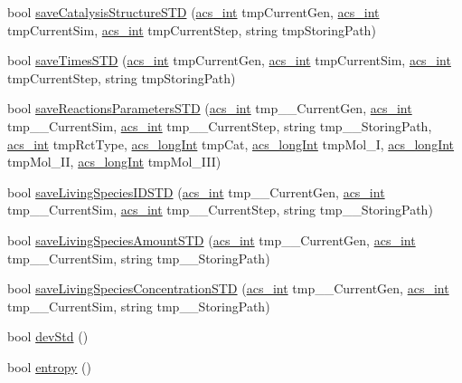 \begin{DoxyCompactItemize}
\item 
bool \hyperlink{a00014_a0a799b3a42bd90845a915298e184708c}{save\-Catalysis\-Structure\-S\-T\-D} (\hyperlink{a00072_a8d277355641a098190360234e2ebde35}{acs\-\_\-int} tmp\-Current\-Gen, \hyperlink{a00072_a8d277355641a098190360234e2ebde35}{acs\-\_\-int} tmp\-Current\-Sim, \hyperlink{a00072_a8d277355641a098190360234e2ebde35}{acs\-\_\-int} tmp\-Current\-Step, string tmp\-Storing\-Path)
\item 
bool \hyperlink{a00014_a73e83c4fcfe612514714a6692270351e}{save\-Times\-S\-T\-D} (\hyperlink{a00072_a8d277355641a098190360234e2ebde35}{acs\-\_\-int} tmp\-Current\-Gen, \hyperlink{a00072_a8d277355641a098190360234e2ebde35}{acs\-\_\-int} tmp\-Current\-Sim, \hyperlink{a00072_a8d277355641a098190360234e2ebde35}{acs\-\_\-int} tmp\-Current\-Step, string tmp\-Storing\-Path)
\item 
bool \hyperlink{a00014_ad78fcf39a80e447a9aa2f84ab74335e5}{save\-Reactions\-Parameters\-S\-T\-D} (\hyperlink{a00072_a8d277355641a098190360234e2ebde35}{acs\-\_\-int} tmp\-\_\-\-\_\-\-Current\-Gen, \hyperlink{a00072_a8d277355641a098190360234e2ebde35}{acs\-\_\-int} tmp\-\_\-\-\_\-\-Current\-Sim, \hyperlink{a00072_a8d277355641a098190360234e2ebde35}{acs\-\_\-int} tmp\-\_\-\-\_\-\-Current\-Step, string tmp\-\_\-\-\_\-\-Storing\-Path, \hyperlink{a00072_a8d277355641a098190360234e2ebde35}{acs\-\_\-int} tmp\-Rct\-Type, \hyperlink{a00072_a19319d75f02db4308bc5c0026d98cd85}{acs\-\_\-long\-Int} tmp\-Cat, \hyperlink{a00072_a19319d75f02db4308bc5c0026d98cd85}{acs\-\_\-long\-Int} tmp\-Mol\-\_\-\-I, \hyperlink{a00072_a19319d75f02db4308bc5c0026d98cd85}{acs\-\_\-long\-Int} tmp\-Mol\-\_\-\-I\-I, \hyperlink{a00072_a19319d75f02db4308bc5c0026d98cd85}{acs\-\_\-long\-Int} tmp\-Mol\-\_\-\-I\-I\-I)
\item 
bool \hyperlink{a00014_a623c3cda23a18cb7b039c5a666408d72}{save\-Living\-Species\-I\-D\-S\-T\-D} (\hyperlink{a00072_a8d277355641a098190360234e2ebde35}{acs\-\_\-int} tmp\-\_\-\-\_\-\-Current\-Gen, \hyperlink{a00072_a8d277355641a098190360234e2ebde35}{acs\-\_\-int} tmp\-\_\-\-\_\-\-Current\-Sim, \hyperlink{a00072_a8d277355641a098190360234e2ebde35}{acs\-\_\-int} tmp\-\_\-\-\_\-\-Current\-Step, string tmp\-\_\-\-\_\-\-Storing\-Path)
\item 
bool \hyperlink{a00014_a26c70b0a84c37c87952628d4a328c238}{save\-Living\-Species\-Amount\-S\-T\-D} (\hyperlink{a00072_a8d277355641a098190360234e2ebde35}{acs\-\_\-int} tmp\-\_\-\-\_\-\-Current\-Gen, \hyperlink{a00072_a8d277355641a098190360234e2ebde35}{acs\-\_\-int} tmp\-\_\-\-\_\-\-Current\-Sim, string tmp\-\_\-\-\_\-\-Storing\-Path)
\item 
bool \hyperlink{a00014_aedf8d90e1fe734948bf2213489840582}{save\-Living\-Species\-Concentration\-S\-T\-D} (\hyperlink{a00072_a8d277355641a098190360234e2ebde35}{acs\-\_\-int} tmp\-\_\-\-\_\-\-Current\-Gen, \hyperlink{a00072_a8d277355641a098190360234e2ebde35}{acs\-\_\-int} tmp\-\_\-\-\_\-\-Current\-Sim, string tmp\-\_\-\-\_\-\-Storing\-Path)
\item 
bool \hyperlink{a00014_ae7fd21d14f81c4854b3a6163b0278857}{dev\-Std} ()
\item 
bool \hyperlink{a00014_a4e9b60ec8b05e888cf0e55def03ee906}{entropy} ()
\end{DoxyCompactItemize}


